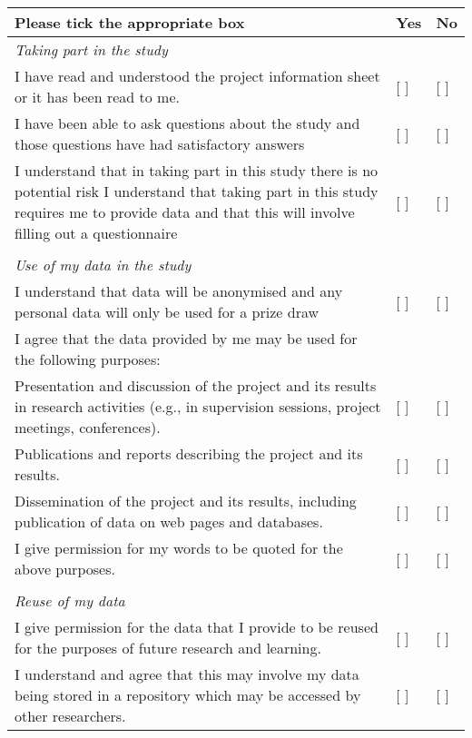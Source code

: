 \documentclass[12pt, a4paper]{report}
\begin{document}
\maketitle

\begin{table}
  \begin{tabular}{p{}p{}p{}}
    Please tick the appropriate box & Yes & No \\
    \hline
    \emph{Taking part in the study}  & & \\
    I have read and understood the project information sheet or it has been read to me. & [ ] & [ ] \\
    I have been able to ask questions about the study and those questions have had satisfactory answers & [ ] & [ ] \\
    I understand that in taking part in this study there is no potential risk
    I understand that taking part in this study requires me to provide data and that this will involve filling out a questionnaire & [ ] & [ ] \\
     & & \\
    \emph{Use of my data in the study} & & \\
    I understand that data will be anonymised and any personal data will only be used for a prize draw & [ ] & [ ] \\
    I agree that the data provided by me may be used for the following purposes: & & \\
    Presentation and discussion of the project and its results in research activities (e.g., in supervision sessions, project meetings, conferences). & [ ] & [ ] \\
    Publications and reports describing the project and its results. & [ ] & [ ] \\
    Dissemination of the project and its results, including publication of data on web pages and databases. & [ ] & [ ] \\
    I give permission for my words to be quoted for the above purposes. & [ ] & [ ] \\
     & & \\
    \emph{Reuse of my data} & & \\
    I give permission for the data that I provide to be reused for the purposes of future research and learning. & [ ] & [ ] \\
    I understand and agree that this may involve my data being stored in a repository which may be accessed by other researchers. & [ ] & [ ] \\

\end{tabular}
\end{table}
\end{document}

